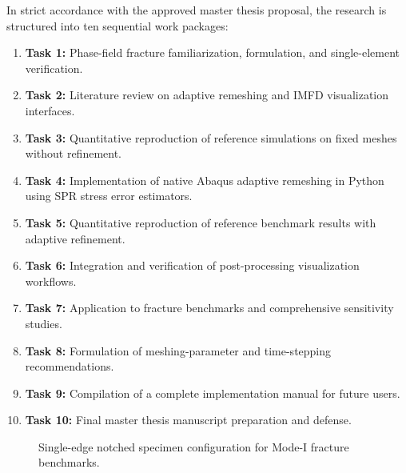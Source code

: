 \documentclass[11pt,a4paper]{report}
\begin{document}
In strict accordance with the approved master thesis proposal, the research is structured into ten sequential work packages:
\begin{enumerate}
    \item \textbf{Task 1:} Phase-field fracture familiarization, formulation, and single-element verification.
    \item \textbf{Task 2:} Literature review on adaptive remeshing and IMFD visualization interfaces.
    \item \textbf{Task 3:} Quantitative reproduction of reference simulations on fixed meshes without refinement.
    \item \textbf{Task 4:} Implementation of native Abaqus adaptive remeshing in Python using SPR stress error estimators.
    \item \textbf{Task 5:} Quantitative reproduction of reference benchmark results with adaptive refinement.
    \item \textbf{Task 6:} Integration and verification of post-processing visualization workflows.
    \item \textbf{Task 7:} Application to fracture benchmarks and comprehensive sensitivity studies.
    \item \textbf{Task 8:} Formulation of meshing-parameter and time-stepping recommendations.
    \item \textbf{Task 9:} Compilation of a complete implementation manual for future users.
    \item \textbf{Task 10:} Final master thesis manuscript preparation and defense.
\end{enumerate}

\begin{figure}[htbp]
\centering
{}
\caption{Single-edge notched specimen configuration for Mode-I fracture benchmarks.}
\label{fig:specimen_geometry}
\end{figure}

\end{document}
